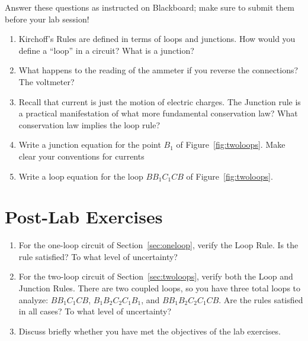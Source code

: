 \documentclass[12pt]{article}
\begin{document}
Answer these questions as instructed on Blackboard; make sure to
submit them before your lab session!

\begin{enumerate}
\item Kirchoff's Rules are defined in terms of loops and junctions.
  How would you define a ``loop'' in a circuit?  What is a junction?
\item What happens to the reading of the ammeter if you reverse the
  connections?  The voltmeter?
\item Recall that current is just the motion of electric charges.  The
  Junction rule is a practical manifestation of what more fundamental
  conservation law?  What conservation law implies the loop rule?
\item Write a junction equation for the point $B_1$ of
  Figure~\ref{fig:twoloops}.  Make clear your conventions for currents
\item Write a loop equation for the loop $BB_1C_1CB$ of
  Figure~\ref{fig:twoloops}. 
\end{enumerate}

\newpage

\section*{Post-Lab Exercises}

\begin{enumerate}
\item For the one-loop circuit of Section~\ref{sec:oneloop}, verify
  the Loop Rule.  Is the rule satisfied?  To what level of uncertainty?
\item For the two-loop circuit of Section~\ref{sec:twoloops}, verify
  both the Loop and Junction Rules.  There are two coupled loops, so
  you have three total loops to analyze: $BB_1C_1CB$,
  $B_1B_2C_2C_1B_1$, and $BB_1B_2C_2C_1CB$.  Are the rules satisfied
  in all cases?  To what level of uncertainty?
\item Discuss briefly whether you have met the objectives of the lab
  exercises. 
\end{enumerate}
\end{document}
